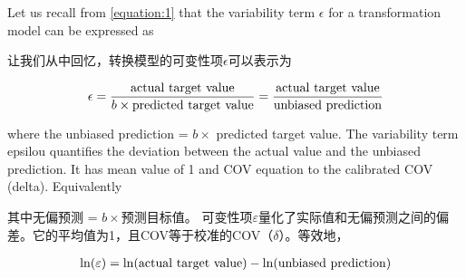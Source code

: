 
\begin{paracol}{2}

    Let us recall from \autoref{equation:1} that the variability term $\epsilon$ for a  transformation model can be expressed as

    \switchcolumn

    让我们从中回忆，转换模型的可变性项$\epsilon$可以表示为
\end{paracol}

\begin{align}
    \epsilon=\dfrac{\rm{actual~target~value}}{b\times{}\rm{predicted~target~value}}=\dfrac{\rm{actual~target~value}}{\rm{unbiased~prediction}}
    \label{equation:2}
\end{align}

\begin{paracol}{2}

    where the unbiased prediction = $b\times$ predicted target value. The variability term epsilou quantifies the deviation between the actual value and the unbiased prediction. It has mean value of 1 and COV equation to the calibrated COV (delta). Equivalently

    \switchcolumn

    其中无偏预测 = $b\times$预测目标值。 可变性项$\varepsilon$量化了实际值和无偏预测之间的偏差。它的平均值为1，且COV等于校准的COV（$\delta$）。等效地，
\end{paracol}

\begin{align}
    \ln(\varepsilon)=\ln(\rm{actual~target~value})-\ln({\rm{unbiased~prediction}})
    \label{equation:3}
\end{align}

